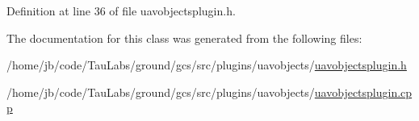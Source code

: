 \-Definition at line 36 of file uavobjectsplugin.\-h.



\-The documentation for this class was generated from the following files\-:\begin{DoxyCompactItemize}
\item 
/home/jb/code/\-Tau\-Labs/ground/gcs/src/plugins/uavobjects/\hyperlink{uavobjectsplugin_8h}{uavobjectsplugin.\-h}\item 
/home/jb/code/\-Tau\-Labs/ground/gcs/src/plugins/uavobjects/\hyperlink{uavobjectsplugin_8cpp}{uavobjectsplugin.\-cpp}\end{DoxyCompactItemize}
